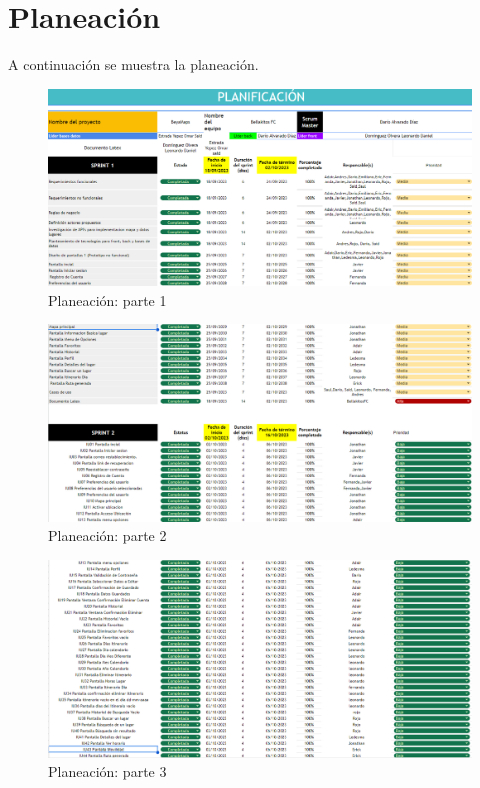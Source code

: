 \section{Planeación}
A continuación se muestra la planeación.

    

\begin{figure}[h]
    \centering
    \includegraphics[width=1\linewidth]{entregable final/UltimaPlaneacion/Captura de pantalla 2023-12-18 100356.png}
    \caption{Planeación: parte 1}
    \label{fig:Planeación parte 1}
\end{figure}
\begin{figure}[h]
    \centering
    \includegraphics[width=1\linewidth]{entregable final/UltimaPlaneacion/Captura de pantalla 2023-12-18 100425.png}
    \caption{Planeación: parte 2}
    \label{fig:Planeación parte 1}
\end{figure}
\begin{figure}[h]
    \centering
    \includegraphics[width=1\linewidth]{entregable final/UltimaPlaneacion/Captura de pantalla 2023-12-18 100439.png}
    \caption{Planeación: parte 3}
    \label{fig:Planeación parte 1}
\end{figure}
